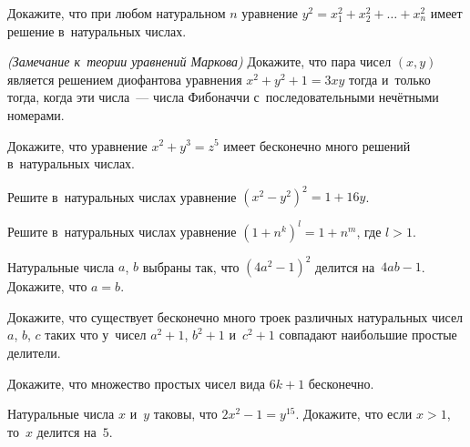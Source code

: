 


\begin{problems}

\item
Докажите, что при любом натуральном $n$ уравнение
$y^2 = x_{1}^2 + x_{2}^2 + \ldots + x_{n}^2$
имеет решение в~натуральных числах.

\item \emph{(Замечание к~теории уравнений Маркова)}
Докажите, что пара чисел $(x, y)$ является решением диофантова уравнения
$x^2 + y^2 + 1 = 3 x y$ тогда и~только тогда, когда эти числа~--- числа
Фибоначчи с~последовательными нечётными номерами.

\item
Докажите, что уравнение $x^2 + y^3 = z^5$ имеет бесконечно много решений
в~натуральных числах.

\item
Решите в~натуральных числах уравнение $(x^2 - y^2)^2 = 1 + 16 y$.

\item
Решите в~натуральных числах уравнение $(1 + n^k)^l = 1 + n^m$, где $l > 1$.

\item
Натуральные числа $a$, $b$ выбраны так, что $(4 a^2 - 1)^2$ делится
на~$4 a b - 1$.
Докажите, что $a = b$.

\item
Докажите, что существует бесконечно много троек различных натуральных
чисел $a$, $b$, $c$ таких что у~чисел $a^2 + 1$, $b^2 + 1$ и~$c^2 + 1$
совпадают наибольшие простые делители.

\item
Докажите, что множество простых чисел вида $6 k + 1$ бесконечно.

\item
Натуральные числа $x$ и~$y$ таковы, что $2 x^2 - 1 = y^{15}$.
Докажите, что если $x > 1$, то~$x$ делится на~$5$.

\end{problems}

